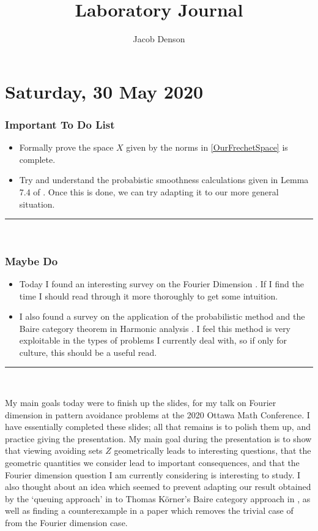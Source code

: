 \documentclass[nobib,nols,a4paper,twoside,symmetric,justified,notoc]{tufte-book}
\title{Laboratory Journal}
\author{Jacob Denson}
\newenvironment{importanttodo}%
    {\subsection{Important To Do List}}%
    {\vspace{2mm}\hrule\hspace{\stretch{1}}\\}
\newenvironment{maybedo}%
    {\subsection{Maybe Do}}%
    {\vspace{2mm}\hrule\hspace{\stretch{1}}\\}
\begin{document}
\maketitle
\tableofcontents
\newpage

\chapter{Saturday, 30 May 2020}

\begin{importanttodo}
\begin{itemize}
    \item Formally prove the space $X$ given by the norms in \eqref{OurFrechetSpace} is complete.

    \item Try and understand the probabistic smoothness calculations given in Lemma 7.4 of \cite{Korner2009}. Once this is done, we can try adapting it to our more general situation.
\end{itemize}
\end{importanttodo}

\begin{maybedo}
\begin{itemize}
    \item Today I found an interesting survey on the Fourier Dimension \cite{Ekstrom2017}. If I find the time I should read through it more thoroughly to get some intuition.

    \item I also found a survey on the application of the probabilistic method and the Baire category theorem in Harmonic analysis \cite{Kahane2000}. I feel this method is very exploitable in the types of problems I currently deal with, so if only for culture, this should be a useful read.
\end{itemize}
\end{maybedo}

My main goals today were to finish up the slides, for my talk on Fourier dimension in pattern avoidance problems at the 2020 Ottawa Math Conference. I have essentially completed these slides; all that remains is to polish them up, and practice giving the presentation. My main goal during the presentation is to show that viewing avoiding sets $Z$ geometrically leads to interesting questions, that the geometric quantities we consider lead to important consequences, and that the Fourier dimension question I am currently considering is interesting to study. I also thought about an idea which seemed to prevent adapting our result obtained by the `queuing approach' in \cite{Denson2019} to Thomas K\"{o}rner's Baire category approach in \cite{Korner2009}, as well as finding a counterexample in a paper which removes the trivial case of \cite{Denson2019} from the Fourier dimension case.
\end{document}
